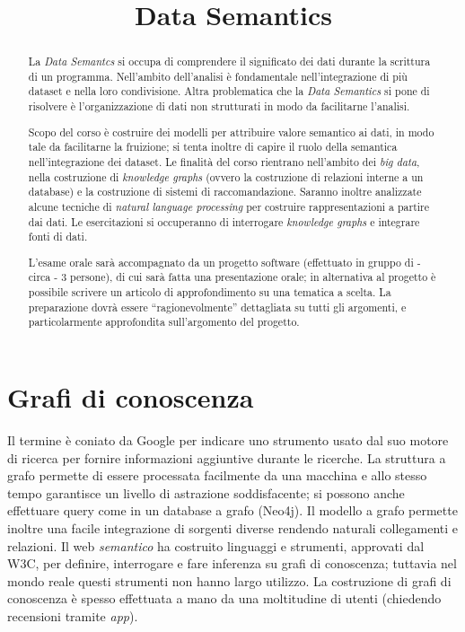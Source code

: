 \documentclass[11pt]{article}
\title{\textbf{Data Semantics}}
\author{}
\date{}
\begin{document}
\maketitle
\begin{abstract}
  La \textit{Data Semantcs} si occupa di comprendere il significato dei dati durante la scrittura di un programma.
  Nell'ambito dell'analisi è fondamentale nell'integrazione di più dataset e nella loro condivisione.
  Altra problematica che la \textit{Data Semantics} si pone di risolvere è l'organizzazione di dati non strutturati in modo da facilitarne l'analisi.
  
  Scopo del corso è costruire dei modelli per attribuire valore semantico ai dati, in modo tale da facilitarne la fruizione; si tenta inoltre di capire il ruolo della semantica nell'integrazione dei dataset.
  Le finalità del corso rientrano nell'ambito dei \textit{big data}, nella costruzione di \textit{knowledge graphs} (ovvero la costruzione di relazioni interne a un database) e la costruzione di sistemi di raccomandazione.
  Saranno inoltre analizzate alcune tecniche di \textit{natural language processing} per costruire rappresentazioni a partire dai dati. \newline
  Le esercitazioni si occuperanno di interrogare \textit{knowledge graphs} e integrare fonti di dati.

  L'esame orale sarà accompagnato da un progetto software (effettuato in gruppo di - circa - 3 persone), di cui sarà fatta una presentazione orale; in alternativa al progetto è possibile scrivere un articolo di approfondimento su una tematica a scelta.
  La preparazione dovrà essere ``ragionevolmente'' dettagliata su tutti gli argomenti, e particolarmente approfondita sull'argomento del progetto.
\end{abstract}

\newpage
\tableofcontents

\newpage
\part{Grafi di conoscenza}
Il termine è coniato da Google per indicare uno strumento usato dal suo motore di ricerca per fornire informazioni aggiuntive durante le ricerche.
La struttura a grafo permette di essere processata facilmente da una macchina e allo stesso tempo garantisce un livello di astrazione soddisfacente; si possono anche effettuare query come in un database a grafo (Neo4j).
Il modello a grafo permette inoltre una facile integrazione di sorgenti diverse rendendo naturali collegamenti e relazioni.
Il web \textit{semantico} ha costruito linguaggi e strumenti, approvati dal W3C, per definire, interrogare e fare inferenza su grafi di conoscenza; tuttavia nel mondo reale questi strumenti non hanno largo utilizzo.
La costruzione di grafi di conoscenza è spesso effettuata a mano da una moltitudine di utenti (chiedendo recensioni tramite \textit{app}).
\end{document}
